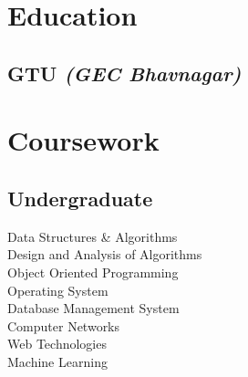 \documentclass[]{deedy-resume-openfont}
\begin{document}
\begin{minipage}[t]{0.35\textwidth} 


\section{Education} 

\subsection{GTU \footnotesize \textit{(GEC Bhavnagar)}}

\sectionsep




\section{Coursework}
\subsection{Undergraduate}
Data Structures \& Algorithms \\
Design and Analysis of Algorithms \\
Object Oriented Programming \\
Operating System \\
Database Management System \\
Computer Networks \\
Web Technologies \\
Machine Learning \\


\end{minipage}
\end{document}
